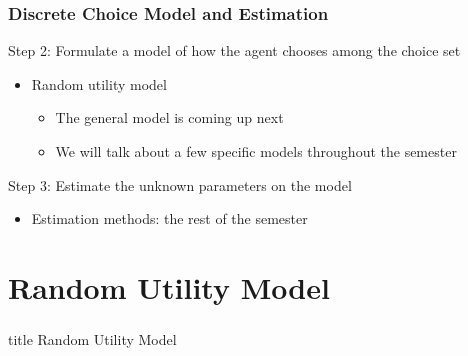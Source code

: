 \documentclass{beamer}\usepackage[]{graphicx}\usepackage[]{xcolor}
\begin{document}
\begin{frame}\frametitle{Discrete Choice Model and Estimation}
    Step 2: Formulate a model of how the agent chooses among the choice set \\
    \begin{itemize}
    	\item Random utility model
    	\begin{itemize}
    		\item The general model is coming up next
    		\item We will talk about a few specific models throughout the semester
    	\end{itemize}
    \end{itemize}
    \vspace{3ex}
    Step 3: Estimate the unknown parameters on the model
    \begin{itemize}
    	\item Estimation methods: the rest of the semester
    \end{itemize}
\end{frame}

\section{Random Utility Model}
\label{rum}
\begin{frame}\frametitle{}
    \vfill
    \centering
    \begin{beamercolorbox}[center]{title}
        \Large Random Utility Model
    \end{beamercolorbox}
    \vfill
\end{frame}
\end{document}
